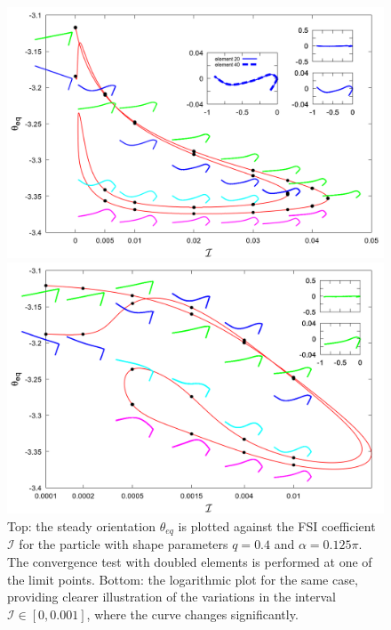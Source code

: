 \documentclass[12pt,MSc,twoside]{muthesis_2020}
\begin{document}
\begin{figure}[!h]
	\begin{minipage}[t]{1\textwidth}
		\centering
		\includegraphics[width=\textwidth]{plot/combine_elastic_beam_I_theta_q_0.400_alpha_0.125pi_initial_-4.80_0.png}
	\end{minipage}
     \hfill
	\begin{minipage}[t]{1\textwidth}
		\centering
		\includegraphics[width=\textwidth]{plot/initial_combine_elastic_beam_I_theta_q_0.400_alpha_0.125pi_initial_-4.80_0.png}
	\end{minipage}
	\caption{Top: the steady orientation $\theta_{eq}$ is plotted against  the FSI coefficient $\mathcal{I}$ for the particle with shape parameters $q = 0.4$ and $\alpha = 0.125\pi$. The convergence test with doubled elements is performed at one of the limit points. Bottom: the logarithmic plot for the same case, providing clearer illustration of the variations in the interval $\mathcal{I} \in [0, 0.001]$, where the curve changes significantly.}
    \label{fig:8}
\end{figure}
\end{document}
